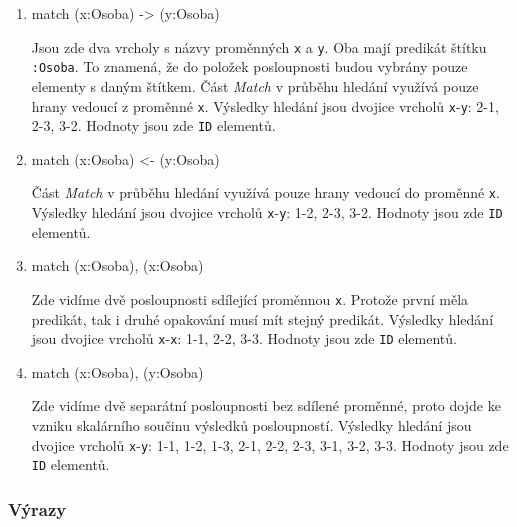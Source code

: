 \begin{enumerate}
\item
\begin{code}
match (x:Osoba) -> (y:Osoba)
\end{code}
Jsou zde dva vrcholy s názvy proměnných \texttt{x} a \texttt{y}.
Oba mají predikát štítku \texttt{:Osoba}.
To znamená, že do položek posloupnosti budou vybrány pouze elementy s daným štítkem.
Část \textit{Match} v průběhu hledání využívá pouze hrany vedoucí z proměnné \texttt{x}.
Výsledky hledání jsou dvojice vrcholů \texttt{x}-\texttt{y}: 2-1, 2-3, 3-2.
Hodnoty jsou zde \texttt{ID} elementů.

\item
\begin{code}
match (x:Osoba) <- (y:Osoba)
\end{code}
Část \textit{Match} v průběhu hledání využívá pouze hrany vedoucí do proměnné \texttt{x}.
Výsledky hledání jsou dvojice vrcholů \texttt{x}-\texttt{y}: 1-2, 2-3, 3-2.
Hodnoty jsou zde \texttt{ID} elementů.

\item
\begin{code}
match (x:Osoba), (x:Osoba) 
\end{code}
Zde vidíme dvě posloupnosti sdílející proměnnou \texttt{x}.
Protože první měla predikát, tak i druhé opakování musí mít stejný predikát.
Výsledky hledání jsou dvojice vrcholů \texttt{x}-\texttt{x}: 1-1, 2-2, 3-3.
Hodnoty jsou zde \texttt{ID} elementů.

\item
\begin{code}
match (x:Osoba), (y:Osoba) 
\end{code}
Zde vidíme dvě separátní posloupnosti bez sdílené proměnné, proto dojde ke vzniku skalárního součinu výsledků posloupností.
Výsledky hledání jsou dvojice vrcholů \texttt{x}-\texttt{y}: 1-1, 1-2, 1-3, 2-1, 2-2, 2-3, 3-1, 3-2, 3-3.
Hodnoty jsou zde \texttt{ID} elementů.

\end{enumerate}

\subsubsection{Výrazy}

